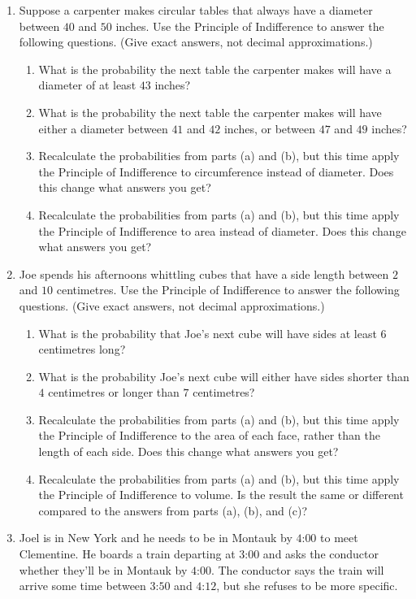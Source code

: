 \documentclass[justified]{tufte-book}
\providecommand{\tightlist}{%
  \setlength{\itemsep}{0pt}\setlength{\parskip}{0pt}}
\theoremstyle{definition}
\theoremstyle{definition}
\theoremstyle{definition}
\theoremstyle{remark}
\begin{document}
\begin{enumerate}
\item
  Suppose a carpenter makes circular tables that always have a diameter
  between \(40\) and \(50\) inches. Use the Principle of Indifference to
  answer the following questions. (Give exact answers, not decimal
  approximations.)

  \begin{enumerate}
  \def\labelenumii{\alph{enumii}.}
  \tightlist
  \item
    What is the probability the next table the carpenter makes will have
    a diameter of at least \(43\) inches?
  \item
    What is the probability the next table the carpenter makes will have
    either a diameter between \(41\) and \(42\) inches, or between
    \(47\) and \(49\) inches?
  \item
    Recalculate the probabilities from parts (a) and (b), but this time
    apply the Principle of Indifference to circumference instead of
    diameter. Does this change what answers you get?
  \item
    Recalculate the probabilities from parts (a) and (b), but this time
    apply the Principle of Indifference to area instead of diameter.
    Does this change what answers you get?
  \end{enumerate}
\item
  Joe spends his afternoons whittling cubes that have a side length
  between \(2\) and \(10\) centimetres. Use the Principle of
  Indifference to answer the following questions. (Give exact answers,
  not decimal approximations.)

  \begin{enumerate}
  \def\labelenumii{\alph{enumii}.}
  \tightlist
  \item
    What is the probability that Joe's next cube will have sides at
    least \(6\) centimetres long?
  \item
    What is the probability Joe's next cube will either have sides
    shorter than \(4\) centimetres or longer than \(7\) centimetres?
  \item
    Recalculate the probabilities from parts (a) and (b), but this time
    apply the Principle of Indifference to the area of each face, rather
    than the length of each side. Does this change what answers you get?
  \item
    Recalculate the probabilities from parts (a) and (b), but this time
    apply the Principle of Indifference to volume. Is the result the
    same or different compared to the answers from parts (a), (b), and
    (c)?
  \end{enumerate}
\item
  Joel is in New York and he needs to be in Montauk by \(4\):\(00\) to
  meet Clementine. He boards a train departing at \(3\):\(00\) and asks
  the conductor whether they'll be in Montauk by \(4\):\(00\). The
  conductor says the train will arrive some time between \(3\):\(50\)
  and \(4\):\(12\), but she refuses to be more specific.


\end{enumerate}
\end{document}
